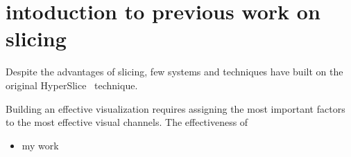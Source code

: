 \section{intoduction to previous work on slicing}
\label{intoduction-to-previous-work-on-slicing}

Despite the advantages of slicing, few systems and techniques have built on
the original HyperSlice~\cite{Wijk:1993} technique.

Building an effective visualization requires assigning the most important 
factors to the most effective visual channels. The effectiveness of 


\begin{itemize}
\tightlist
\item
  my work
\end{itemize}

